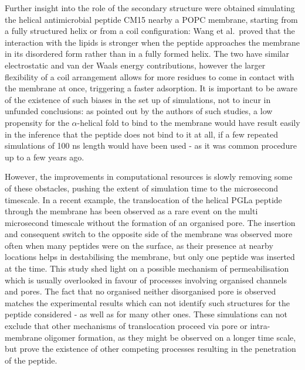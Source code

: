 Further insight into the role of the secondary structure were obtained simulating the helical antimicrobial peptide CM15 nearby a POPC membrane, starting from a fully structured helix or from a coil configuration: Wang et al.\ proved that the interaction with the lipids is stronger when the peptide approaches the membrane in its disordered form rather than in a fully formed helix. The two have similar electrostatic and van der Waals energy contributions, however the larger flexibility of a coil arrangement allows for more residues to come in contact with the membrane at once, triggering a faster adsorption. It is important to be aware of the existence of such biases in the set up of simulations, not to incur in unfunded conclusions: as pointed out by the authors of such studies, a low propensity for the $\alpha$-helical fold to bind to the membrane would have result easily in the inference that the peptide does not bind to it at all, if a few repeated simulations of 100 ns length would have been used - as it was common procedure up to a few years ago.

However, the improvements in computational resources is slowly removing some of these obstacles, pushing the extent of simulation time to the microsecond timescale.
%
In a recent example, the translocation of the helical PGLa peptide through the membrane has been observed as a rare event on the multi microsecond timescale without the formation of an organised pore. The insertion and consequent switch to the opposite side of the membrane was observed more often when many peptides were on the surface, as their presence at nearby locations helps in destabilising the membrane, but only one peptide was inserted at the time. This study shed light on a possible mechanism of permeabilisation which is usually overlooked in favour of processes involving organised channels and pores. The fact that no organised neither disorganised pore is observed matches the experimental results which can not identify such structures for the peptide considered - as well as for many other ones. These simulations can not exclude that other mechanisms of translocation proceed via pore or intra-membrane oligomer formation, as they might be observed on a longer time scale, but prove the existence of other competing processes resulting in the penetration of the peptide.

